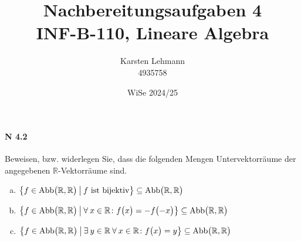 \documentclass{scrreprt}
\author{Karsten Lehmann \\ 4935758}
\date{WiSe 2024/25}
\title{Nachbereitungsaufgaben 4\\INF-B-110, Lineare Algebra}
\begin{document}
\paragraph{N 4.2} Beweisen, bzw. widerlegen Sie, dass die folgenden Mengen
Untervektorräume der angegebenen $\mathbb{R}$-Vektorräume sind.
\begin{enumerate}[(a)]
  \item $\qty{f \in \text{Abb}\qty\big(\mathbb{R}, \mathbb{R}) \:\middle|\: f \text{ ist bijektiv}} \subseteq \text{Abb}\qty\big(\mathbb{R}, \mathbb{R})$
  \item $\qty{f \in \text{Abb}\qty\big(\mathbb{R}, \mathbb{R}) \:\middle|\: \forall\: x \in \mathbb{R} \colon f\qty\big(x) = -f\qty\big(-x)} \subseteq \text{Abb}\qty\big(\mathbb{R}, \mathbb{R})$
  \item $\qty{f \in \text{Abb}\qty\big(\mathbb{R}, \mathbb{R}) \:\middle|\: \exists\: y \in \mathbb{R} \: \forall\: x \in \mathbb{R} \colon f\qty\big(x) = y} \subseteq \text{Abb}\qty\big(\mathbb{R}, \mathbb{R})$
  \end{enumerate}
\end{document}
